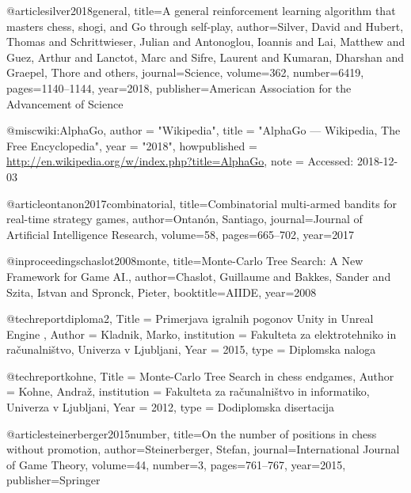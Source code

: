 @article{silver2018general,
  title={A general reinforcement learning algorithm that masters chess, shogi, and Go through self-play},
  author={Silver, David and Hubert, Thomas and Schrittwieser, Julian and Antonoglou, Ioannis and Lai, Matthew and Guez, Arthur and Lanctot, Marc and Sifre, Laurent and Kumaran, Dharshan and Graepel, Thore and others},
  journal={Science},
  volume={362},
  number={6419},
  pages={1140--1144},
  year={2018},
  publisher={American Association for the Advancement of Science}
}

@misc{wiki:AlphaGo,
   author = "Wikipedia",
   title = "{AlphaGo} --- {W}ikipedia{,} The Free Encyclopedia",
   year = "2018",
   howpublished = {\url{http://en.wikipedia.org/w/index.php?title=AlphaGo}},
   note = {Accessed: 2018-12-03}
 }
 
@article{ontanon2017combinatorial,
  title={Combinatorial multi-armed bandits for real-time strategy games},
  author={Ontan{\'o}n, Santiago},
  journal={Journal of Artificial Intelligence Research},
  volume={58},
  pages={665--702},
  year={2017}
}

@inproceedings{chaslot2008monte,
  title={Monte-Carlo Tree Search: A New Framework for Game {AI}.},
  author={Chaslot, Guillaume and Bakkes, Sander and Szita, Istvan and Spronck, Pieter},
  booktitle={AIIDE},
  year={2008}
}

@techreport{diploma2,
  Title                    = {Primerjava igralnih pogonov Unity in Unreal Engine },
  Author                   = {Kladnik, Marko},
  institution              = {Fakulteta za elektrotehniko in ra\v{c}unalni\v{s}tvo, Univerza v Ljubljani},
  Year                     = {2015},
  type                     = {Diplomska naloga}
}

@techreport{kohne,
  Title                   = {Monte-Carlo Tree Search in chess endgames},
  Author                  = {Kohne, Andraž},
  institution             = {Fakulteta za ra\v{c}unalni\v{s}tvo in informatiko, Univerza v Ljubljani},
  Year                    = {2012},
  type                    = {Dodiplomska disertacija}
}

@article{steinerberger2015number,
  title={On the number of positions in chess without promotion},
  author={Steinerberger, Stefan},
  journal={International Journal of Game Theory},
  volume={44},
  number={3},
  pages={761--767},
  year={2015},
  publisher={Springer}
}